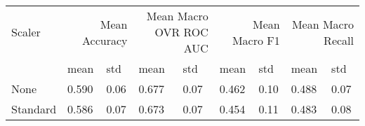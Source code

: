 \begin{tabular}{lllllllll}
\toprule
Scaler & \multicolumn{2}{r}{Mean Accuracy} & \multicolumn{2}{r}{Mean Macro OVR ROC AUC} & \multicolumn{2}{r}{Mean Macro F1} & \multicolumn{2}{r}{Mean Macro Recall} \\
 & mean & std & mean & std & mean & std & mean & std \\
\midrule
None & 0.590 & 0.06 & 0.677 & 0.07 & 0.462 & 0.10 & 0.488 & 0.07 \\
Standard & 0.586 & 0.07 & 0.673 & 0.07 & 0.454 & 0.11 & 0.483 & 0.08 \\
\bottomrule
\end{tabular}
